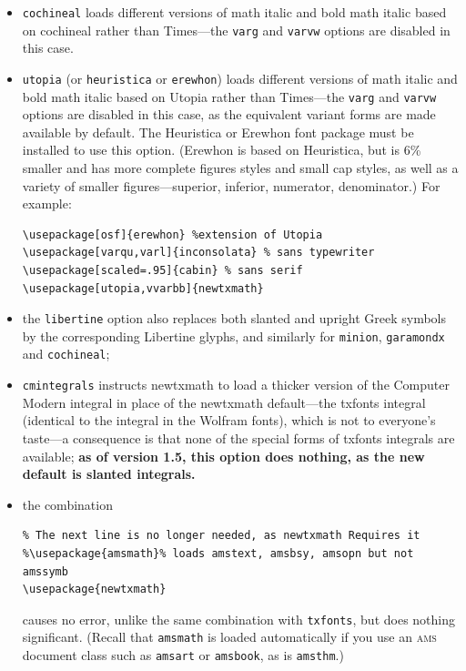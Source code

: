 \documentclass[11pt]{article}
\theoremstyle{oldplain}
\theoremstyle{plain}
\begin{document}
\begin{itemize}
\item {\tt cochineal}  loads different versions of math italic and bold math italic based on \textsf{cochineal} rather than \textsf{Times}---the {\tt varg} and {\tt varvw} options are disabled in this case.
\item {\tt utopia} (or {\tt heuristica} or {\tt erewhon}) loads different versions of math italic and bold math italic based on \textsf{Utopia} rather than \textsf{Times}---the {\tt varg} and {\tt varvw} options are disabled in this case, as the equivalent variant forms are made available by default. The Heuristica or Erewhon font package must be installed to use this option. (Erewhon is based on Heuristica, but is 6\% smaller and has more complete figures styles and small cap styles, as well as a variety of smaller figures---superior, inferior, numerator, denominator.)  For example:
\begin{verbatim}
\usepackage[osf]{erewhon} %extension of Utopia
\usepackage[varqu,varl]{inconsolata} % sans typewriter
\usepackage[scaled=.95]{cabin} % sans serif
\usepackage[utopia,vvarbb]{newtxmath}
\end{verbatim}
\item the {\tt libertine} option also replaces both slanted and upright Greek  symbols by the corresponding Libertine glyphs, and similarly for {\tt minion}, {\tt garamondx} and {\tt cochineal};
\item
{\tt cmintegrals} instructs \textsf{newtxmath} to load a thicker version of the Computer Modern integral in place of the \textsf{newtxmath} default---the txfonts integral (identical to the integral in the Wolfram fonts), which is not to everyone's taste---a consequence is that none of the special forms of \textsf{txfonts} integrals are available;
\textbf{as of version 1.5, this option does nothing, as the new default is slanted integrals.}
\item the combination
\begin{verbatim}
% The next line is no longer needed, as newtxmath Requires it
%\usepackage{amsmath}% loads amstext, amsbsy, amsopn but not amssymb
\usepackage{newtxmath}
\end{verbatim}
causes no error, unlike the same combination with {\tt txfonts}, but does nothing significant. (Recall that {\tt amsmath} is loaded automatically if you use an \textsc{ams} document class such as {\tt amsart} or {\tt amsbook}, as is {\tt amsthm}.) 

\end{itemize}
\end{document}
